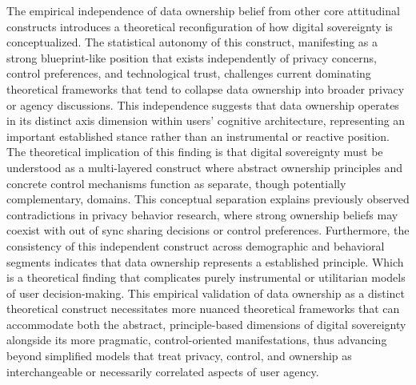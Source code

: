 	The empirical independence of data ownership belief from other core attitudinal constructs introduces a theoretical reconfiguration of how digital sovereignty is conceptualized. The statistical autonomy of this construct, manifesting as a strong blueprint-like position that exists independently of privacy concerns, control preferences, and technological trust, challenges current dominating theoretical frameworks that tend to collapse data ownership into broader privacy or agency discussions. This independence suggests that data ownership operates in its distinct axis dimension within users' cognitive architecture, representing an important established stance rather than an instrumental or reactive position. The theoretical implication of this finding is that digital sovereignty must be understood as a multi-layered construct where abstract ownership principles and concrete control mechanisms function as separate, though potentially complementary, domains. This conceptual separation explains previously observed contradictions in privacy behavior research, where strong ownership beliefs may coexist with out of sync sharing decisions or control preferences. Furthermore, the consistency of this independent construct across demographic and behavioral segments indicates that data ownership represents a established principle. Which is a theoretical finding that complicates purely instrumental or utilitarian models of user decision-making. This empirical validation of data ownership as a distinct theoretical construct necessitates more nuanced theoretical frameworks that can accommodate both the abstract, principle-based dimensions of digital sovereignty alongside its more pragmatic, control-oriented manifestations, thus advancing beyond simplified models that treat privacy, control, and ownership as interchangeable or necessarily correlated aspects of user agency.

